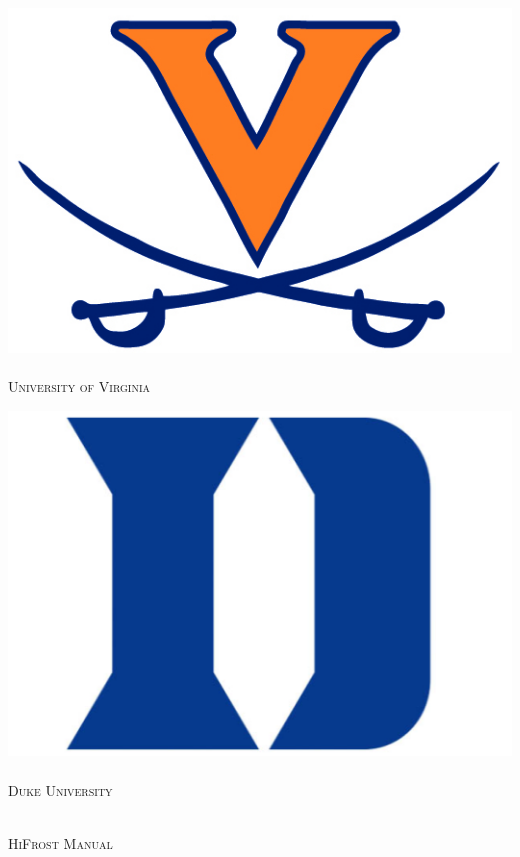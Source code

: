 \begin{titlepage}
\begin{center}

\noindent\begin{minipage}{.4\textwidth}
\centering
\includegraphics[width=\linewidth]{./img/uva-logo.png}~\\[.5cm]
\textsc{\normalsize University of Virginia}\\[1.5cm]
\end{minipage}
\hfill
\noindent\begin{minipage}{.4\textwidth}
\centering
\includegraphics[width=\linewidth]{./img/duke-logo.png}~\\[.5cm]
\textsc{\normalsize Duke University}\\[1.5cm]
\end{minipage}
\\[80pt]
\textsc{\Large HiFrost Manual}\\[0.5cm]


\end{center}
\end{titlepage}
